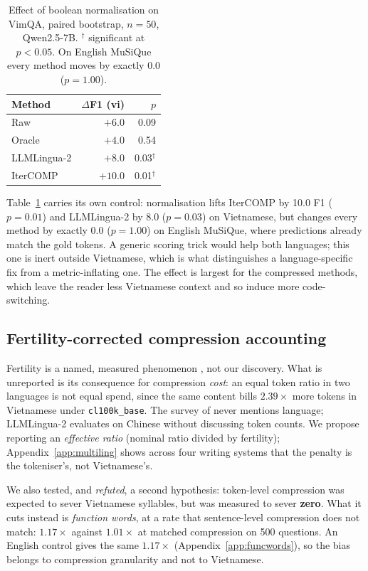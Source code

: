 \documentclass[11pt]{article}
\begin{document}
\begin{table}[!ht]
\centering
\small
\begin{tabular}{lrr}
\toprule
Method & $\Delta$F1 (vi) & $p$ \\
\midrule
Raw          & $+6.0$  & 0.09        \\
Oracle       & $+4.0$  & 0.54        \\
LLMLingua-2  & $+8.0$  & 0.03$^\dag$ \\
IterCOMP     & $+10.0$ & 0.01$^\dag$ \\
\bottomrule
\end{tabular}
\caption{Effect of boolean normalisation on VimQA, paired bootstrap, $n=50$,
Qwen2.5-7B. $^\dag$ significant at $p<0.05$. On English MuSiQue every method
moves by exactly $0.0$ ($p=1.00$).}
\label{tab:boolnorm7b}
\end{table}

Table~\ref{tab:boolnorm7b} carries its own control: normalisation lifts IterCOMP by 10.0 F1 ($p=0.01$) and LLMLingua-2 by 8.0 ($p=0.03$) on Vietnamese, but changes every method by exactly $0.0$ ($p=1.00$) on English MuSiQue, where predictions already match the gold tokens. A generic scoring trick would help both languages; this one is inert outside Vietnamese, which is what distinguishes a language-specific fix from a metric-inflating one. The effect is largest for the compressed methods, which leave the reader less Vietnamese context and so induce more code-switching.

\subsection{Fertility-corrected compression accounting}
Fertility is a named, measured phenomenon
\citep{petrov2023tokenizers,ahia2023allcost}, not our discovery. What is
unreported is its consequence for compression \emph{cost}: an equal token ratio in
two languages is not equal spend, since the same content bills $2.39\times$ more
tokens in Vietnamese under \texttt{cl100k\_base}. The survey of
\citet{li2025promptcompression} never mentions language; LLMLingua-2
\citep{pan2024llmlingua2} evaluates on Chinese without discussing token counts. We
propose reporting an \emph{effective ratio} (nominal ratio divided by fertility);
Appendix~\ref{app:multiling} shows across four writing systems that the penalty
is the tokeniser's, not Vietnamese's.

We also tested, and \emph{refuted}, a second hypothesis: token-level
compression was expected to sever Vietnamese syllables, but was measured to sever
\textbf{zero}. What it cuts instead is \emph{function words}, at a rate that
sentence-level compression does not match: $1.17\times$ against $1.01\times$ at
matched compression on 500 questions. An English control gives the same
$1.17\times$ (Appendix~\ref{app:funcwords}), so the bias belongs to compression
granularity and not to Vietnamese.
\end{document}
